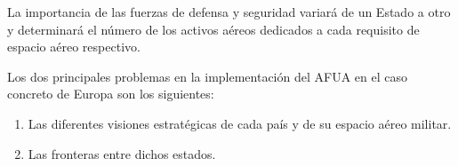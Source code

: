 La importancia de las fuerzas de defensa y seguridad variará de un Estado a otro y determinará el número de los activos aéreos dedicados a cada requisito de espacio aéreo respectivo.

Los dos principales problemas en la implementación del AFUA en el caso concreto de Europa son los siguientes:

\begin{enumerate}
    \item Las diferentes visiones estratégicas de cada país y de su espacio aéreo militar.
    \item Las fronteras entre dichos estados.
\end{enumerate}